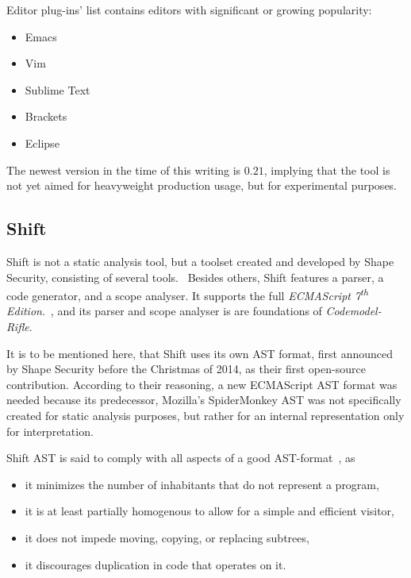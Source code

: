 Editor plug-ins' list contains editors with significant or growing popularity:

\begin{itemize}
\item Emacs
\item Vim
\item Sublime Text
\item Brackets
\item Eclipse
\end{itemize}

The newest version in the time of this writing is $0.21$, implying that the tool is not yet aimed for heavyweight production usage, but for experimental purposes.


\subsection{Shift}

Shift is not a static analysis tool, but a toolset created and developed by Shape Security, consisting of several tools.~\cite{shift-ast} Besides others, Shift features a parser, a code generator, and a scope analyser. It supports the full \emph{ECMAScript 7\textsuperscript{th} Edition}.~\cite{shift-ast}, and its parser and scope analyser is are foundations of \emph{Codemodel-Rifle}.

It is to be mentioned here, that Shift uses its own AST format, first announced by Shape Security before the Christmas of 2014, as their first open-source contribution. According to their reasoning, a new ECMAScript AST format was needed because its predecessor, Mozilla's SpiderMonkey AST was not specifically created for static analysis purposes, but rather for an internal representation only for interpretation.

Shift AST is said to comply with all aspects of a good AST-format~\cite{shift-ast-comparison}, as

\begin{itemize}
\item it minimizes the number of inhabitants that do not represent a program,
\item it is at least partially homogenous to allow for a simple and efficient visitor,
\item it does not impede moving, copying, or replacing subtrees,
\item it discourages duplication in code that operates on it.~\cite{shift-ast-comparison}
\end{itemize}

